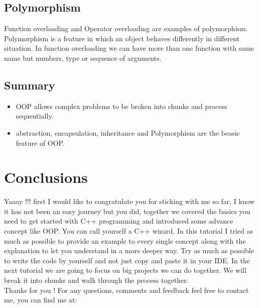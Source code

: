 \documentclass[11pt, a4paper]{article}
\begin{document}
\subsection{Polymorphism}
Function overloading and Operator overloading are examples of polymorphism.
Polymorphism is a feature in which an object behaves differently in different situation.
In function overloading we can have more than one function with same name but numbers,
type or sequence of arguments.


\subsection{Summary}
\begin{itemize}
    \item OOP allows complex problems to be broken into chunks and process sequentially.
    \item abstraction, encapsulation, inheritance and Polymorphism are the beasic feature of OOP.
\end{itemize}

\section{Conclusions}
Yaaay !!! first I would like to congratulate you for sticking with me so far,
I know it has not been an easy journey but you did, together we covered the basics
you need to get started with C++ programming and introduced some advance concept like OOP.
You can call yourself a C++ wizard. In this tutorial I tried as much as possible to provide
an example to every single concept along with the explanation to let you understand in a more
deeper way. Try as much as possible to write the code by yourself and not just copy and paste
it in your IDE. In the next tutorial we are going to focus on big projects we can do together.
We will break it into chunks and walk through the process together.
\\Thanks for you !
For any questions, comments and feedback feel free to contact me, you can find me at: \\
\end{document}
